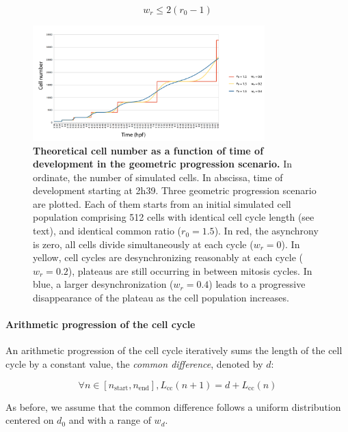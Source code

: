 $$w_r \leq 2(r_0 -1)$$
\begin{figure}
\begin{center}
\includegraphics[width=0.8\textwidth]{../../images/Cases_Studies/Case_1_Division/cell_number_plot/cell_number_plot.png}
\end{center}
\caption{\textbf{Theoretical cell number as a function of time of development in the geometric progression scenario.} In ordinate, the number of simulated cells. In abscissa, time of development starting at 2h39. Three geometric progression scenario are plotted. Each of them starts from an initial simulated cell population comprising 512 cells with identical cell cycle length (see text), and identical common ratio ($r_0 = 1.5$). In red, the asynchrony is zero, all cells divide simultaneously at each cycle ($w_r = 0$). In yellow, cell cycles are desynchronizing reasonably at each cycle ($w_r = 0.2$), plateaus are still occurring in between mitosis cycles. In blue, a larger desynchronization ($w_r = 0.4$) leads to a progressive disappearance of the plateau as the cell population increases. }
\label{cell_number_plot_cell_number_plot}
\end{figure}

\paragraph{Arithmetic progression of the cell cycle}


An arithmetic progression of the cell cycle iteratively sums the length of the cell cycle by a constant value, the \textit{common difference}, denoted by $d$:

$$\forall n \in \left[ n_{\mathrm{start}}, n_{\mathrm{end}} \right], L_{\mathrm{cc}}(n+1) = d + L_{\mathrm{cc}}(n)$$

As before, we assume that the common difference follows a uniform distribution centered on $d_0$ and with a range of $w_d$.

